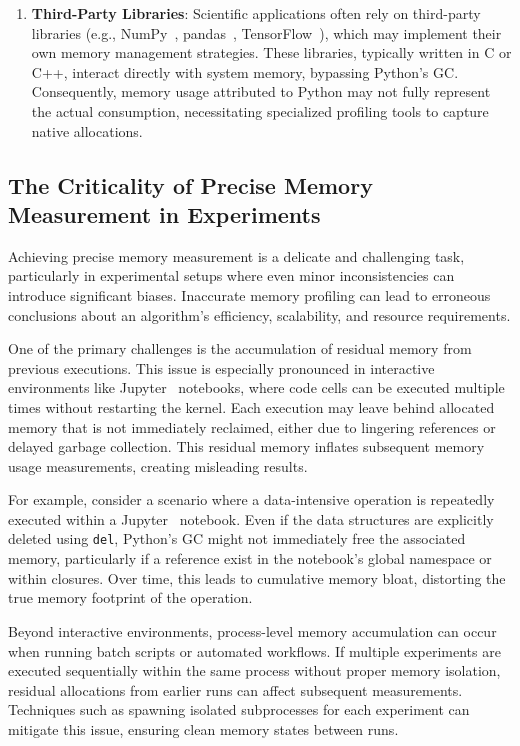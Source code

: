 \begin{enumerate}
    \item \textbf{Third-Party Libraries}:
    Scientific applications often rely on third-party libraries (e.g., NumPy~\cite{numpy}, pandas~\cite{pandas}, TensorFlow~\cite{tensorflow}), which may implement their own memory management strategies.
    These libraries, typically written in C or C++, interact directly with system memory, bypassing Python's \ac{GC}.
    Consequently, memory usage attributed to Python may not fully represent the actual consumption, necessitating specialized profiling tools to capture native allocations.
\end{enumerate}

\subsection{The Criticality of Precise Memory Measurement in Experiments}
\label{subsec:mmc-criticality-of-precise-memory-measurement}

Achieving precise memory measurement is a delicate and challenging task, particularly in experimental setups where even minor inconsistencies can introduce significant biases.
Inaccurate memory profiling can lead to erroneous conclusions about an algorithm's efficiency, scalability, and resource requirements.

One of the primary challenges is the accumulation of residual memory from previous executions.
This issue is especially pronounced in interactive environments like Jupyter~\cite{jupyter} notebooks, where code cells can be executed multiple times without restarting the kernel.
Each execution may leave behind allocated memory that is not immediately reclaimed, either due to lingering references or delayed garbage collection.
This residual memory inflates subsequent memory usage measurements, creating misleading results.

For example, consider a scenario where a data-intensive operation is repeatedly executed within a Jupyter~\cite{jupyter} notebook.
Even if the data structures are explicitly deleted using \texttt{del}, Python's \ac{GC} might not immediately free the associated memory, particularly if a reference exist in the notebook's global namespace or within closures.
Over time, this leads to cumulative memory bloat, distorting the true memory footprint of the operation.

Beyond interactive environments, process-level memory accumulation can occur when running batch scripts or automated workflows.
If multiple experiments are executed sequentially within the same process without proper memory isolation, residual allocations from earlier runs can affect subsequent measurements.
Techniques such as spawning isolated subprocesses for each experiment can mitigate this issue, ensuring clean memory states between runs.

